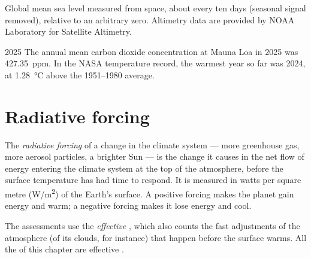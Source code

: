 \begin{omfigure}

{\small Global mean sea level measured from space, about every ten days
(seasonal signal removed), relative to an arbitrary zero. Altimetry data are
provided by NOAA Laboratory for Satellite Altimetry.}
\end{omfigure}

\begin{dated}{2025}
The annual mean carbon dioxide concentration at Mauna Loa in 2025 was
\qty{427.35}{ppm}. In the NASA temperature record, the warmest year so far
was 2024, at \qty{1.28}{\degreeCelsius} above the 1951--1980 average.
\end{dated}

\section{Radiative forcing}

\begin{definition}\label{def:g12:climate-change:forcing}
The \emph{radiative forcing} of a change in the
climate system --- more greenhouse gas, more aerosol particles, a brighter
Sun --- is the change it causes in the net flow of energy entering the
climate system at the top of the atmosphere, before the surface temperature
has had time to respond. It is measured in watts per square metre
(\unit{W/m^2}) of the Earth's surface. A positive forcing makes the planet
gain energy and warm; a negative forcing makes it lose energy and cool.
\end{definition}

\begin{remark}\label{rem:g12:climate-change:effective}
The assessments use the \emph{effective} , which also
counts the fast adjustments of the atmosphere (of its clouds, for instance)
that happen before the surface warms. All the  of this chapter are
effective .
\end{remark}

